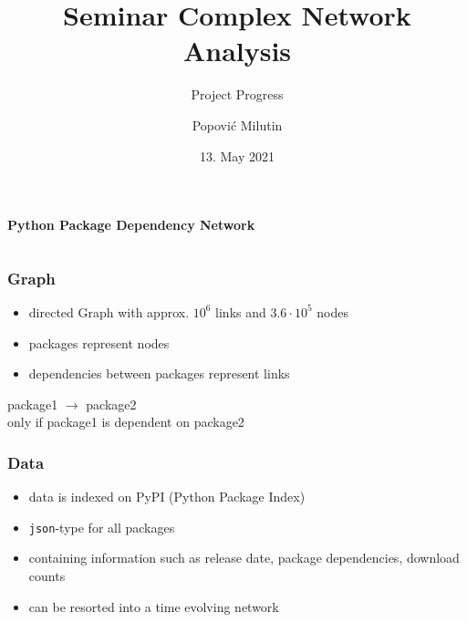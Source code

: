 \documentclass[fleqn]{beamer}
\title
{Seminar Complex Network Analysis}
\subtitle{Project Progress}
\author[Popović Milutin]
{Popović Milutin}
\date{13. May 2021}
\begin{document}
    \begin{frame}
        \titlepage
    \end{frame}

    \begin{frame}
        \centering
        \textbf{Python Package Dependency Network}
        \vspace{1cm}
        \begin{columns}[T]
        \end{columns}
    \end{frame}

    \begin{frame}
        \frametitle{Graph}
        \begin{itemize}
            \item directed Graph with approx. $10^{6}$ links and
                $3.6\cdot10^{5}$ nodes
            \item packages represent nodes
            \item dependencies between packages represent links
        \end{itemize}
        \vspace{1cm}
            \centering package1 $\rightarrow$ package2\\
        \vspace{0.25cm}
            \centering only if package1 is dependent on package2
    \end{frame}

    \begin{frame}
        \frametitle{Data}
        \begin{itemize}
            \item data is indexed on PyPI\cite{pypi} (Python Package Index)
            \item \texttt{json}-type for all packages
            \item containing information such as release date, package
                dependencies, download counts
            \item can be resorted into a time evolving network
        \end{itemize}
    \end{frame}
\end{document}
